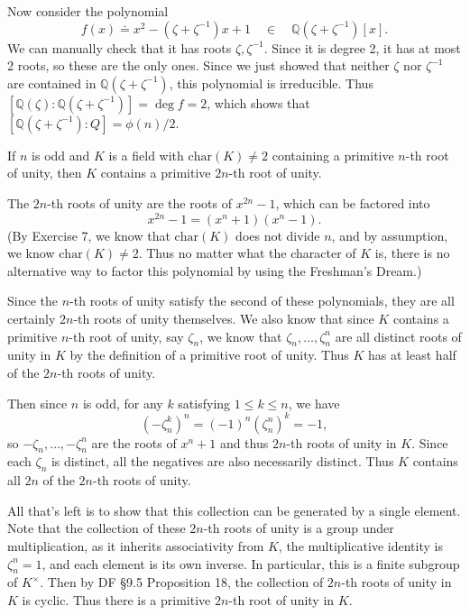 \documentclass[10pt]{report}
\begin{document}
	Now consider the polynomial \[f(x) \doteq x^2-(\zeta+\zeta^{-1})x+1 \quad\in\quad \mathbb{Q}(\zeta+\zeta^{-1})[x].\] We can manually check that it has roots $\zeta, \zeta^{-1}$. Since it is degree 2, it has at most 2 roots, so these are the only ones. Since we just showed that neither $\zeta$ nor $\zeta^{-1}$ are contained in $\mathbb{Q}(\zeta+\zeta^{-1})$, this polynomial is irreducible. Thus $[\mathbb{Q}(\zeta):\mathbb{Q}(\zeta+\zeta^{-1})]=\deg f = 2$, which shows that $[\mathbb{Q}(\zeta+\zeta^{-1}):Q]=\phi(n)/2$.
\newpage

\begin{exer}[]
	If $n$ is odd and $K$ is a field with $\text{char}(K)\neq 2$ containing a primitive $n$-th root of unity, then $K$ contains a primitive $2n$-th root of unity.
\end{exer}

The $2n$-th roots of unity are the roots of $x^{2n}-1$, which can be factored into
\[
	x^{2n}-1 = (x^{n}+1)(x^{n}-1).
\] (By Exercise 7, we know that $\text{char}(K)$ does not divide $n$, and by assumption, we know $\text{char}(K)\neq 2$. Thus no matter what the character of $K$ is, there is no alternative way to factor this polynomial by using the Freshman's Dream.)

Since the $n$-th roots of unity satisfy the second of these polynomials, they are all certainly $2n$-th roots of unity themselves. We also know that since $K$ contains a primitive $n$-th root of unity, say $\zeta_n$, we know that $\zeta_n, \dots, \zeta_n^n$ are all distinct roots of unity in $K$ by the definition of a primitive root of unity. Thus $K$ has at least half of the $2n$-th roots of unity.

Then since $n$ is odd, for any $k$ satisfying $1\leq k\leq n$, we have
\[
	(-\zeta_{n}^{k})^n = (-1)^{n}(\zeta_{n}^{n})^k = -1,
\] so $-\zeta_{n}, \dots, -\zeta_{n}^{n}$ are the roots of $x^n+1$ and thus $2n$-th roots of unity in $K$. Since each $\zeta_n$ is distinct, all the negatives are also necessarily distinct. Thus $K$ contains all $2n$ of the $2n$-th roots of unity.

All that's left is to show that this collection can be generated by a single element. Note that the collection of these $2n$-th roots of unity is a group under multiplication, as it inherits associativity from $K$, the multiplicative identity is $\zeta_{n}^n=1$, and each element is its own inverse. In particular, this is a finite subgroup of $K^{\times}$. Then by DF \S 9.5 Proposition 18, the collection of  $2n$-th roots of unity in $K$ is cyclic. Thus there is a primitive $2n$-th root of unity in $K$.
\end{document}
